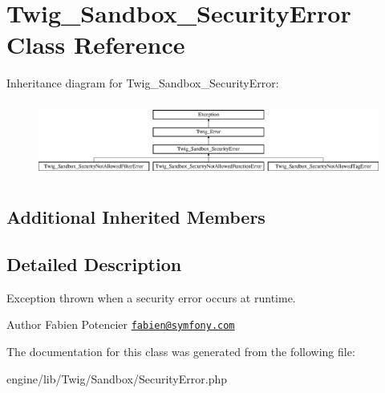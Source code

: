 \hypertarget{class_twig___sandbox___security_error}{}\section{Twig\+\_\+\+Sandbox\+\_\+\+Security\+Error Class Reference}
\label{class_twig___sandbox___security_error}
Inheritance diagram for Twig\+\_\+\+Sandbox\+\_\+\+Security\+Error\+:\begin{figure}[H]
\begin{center}
\leavevmode
\includegraphics[height=2.497213cm]{class_twig___sandbox___security_error}
\end{center}
\end{figure}
\subsection*{Additional Inherited Members}


\subsection{Detailed Description}
Exception thrown when a security error occurs at runtime.

\begin{DoxyAuthor}{Author}
Fabien Potencier \href{mailto:fabien@symfony.com}{\tt fabien@symfony.\+com} 
\end{DoxyAuthor}


The documentation for this class was generated from the following file\+:\begin{DoxyCompactItemize}
\item 
engine/lib/\+Twig/\+Sandbox/Security\+Error.\+php\end{DoxyCompactItemize}
